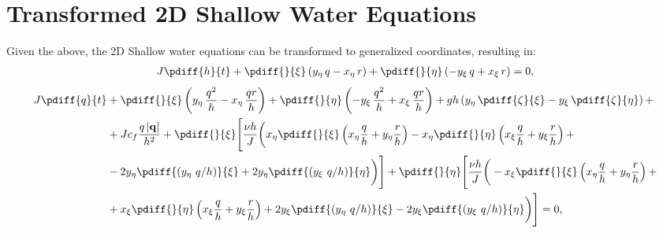 \section{Transformed 2D Shallow Water Equations}
Given the above, the 2D Shallow water equations can be transformed to generalized coordinates, resulting in:
%
	\begin{align}\label{CurviContinuity_Expanded}
		J \pdiff{h}{t} +\pdiff{}{\xi} \left( y_{\eta}\, q - x_{\eta}\, r \right) + \pdiff{}{\eta} \left( -y_{\xi}\, q + x_{\xi}\, r \right) = 0,
	\end{align}
	\begin{align}\label{CurviXmom_Expanded}
		\begin{aligned}
			J \pdiff{q}{t}
			&+ \pdiff{}{\xi} \left( y_{\eta}\, \frac{q^2}{h} - x_{\eta}\, \frac{q r}{h} \right)
			+ \pdiff{}{\eta} \left( -y_{\xi}\, \frac{q^2}{h} + x_{\xi}\, \frac{q r}{h} \right)
			+ g h \left( y_{\eta}\, \pdiff{\zeta}{\xi} - y_{\xi}\, \pdiff{\zeta}{\eta} \right) +
            \\
			&+ J c_f \frac{q\, |\mathbf{q}|}{h^2}
			+ \pdiff{}{\xi}\Bigg[ \frac{\nu h}{J} \bigg(
			x_{\eta} \pdiff{}{\xi}\left( x_{\eta}\frac{q}{h} + y_{\eta}\frac{r}{h}  \right)
			- x_{\eta} \pdiff{}{\eta}\left( x_{\xi} \frac{q}{h} + y_{\xi} \frac{r}{h}  \right) +
            \\
			& - 2 y_{\eta}  \pdiff{(y_{\eta}\ q/h)}{\xi}
			+ 2 y_{\eta}  \pdiff{(y_{\xi}\ q/h)}{\eta} \bigg)\Bigg]
			+ \pdiff{}{\eta}\Bigg[ \frac{\nu h}{J} \bigg(
			- x_{\xi} \pdiff{}{\xi}\left( x_{\eta}\frac{q}{h} + y_{\eta}\frac{r}{h}  \right) +
            \\
			&+ x_{\xi} \pdiff{}{\eta}\left( x_{\xi} \frac{q}{h} + y_{\xi} \frac{r}{h}  \right)
			+ 2 y_{\xi} \pdiff{(y_{\eta}\ q/h)}{\xi}
			- 2 y_{\xi} \pdiff{(y_{\xi}\ q/h)}{\eta} \bigg) \Bigg] = 0,
		\end{aligned}
	\end{align}
